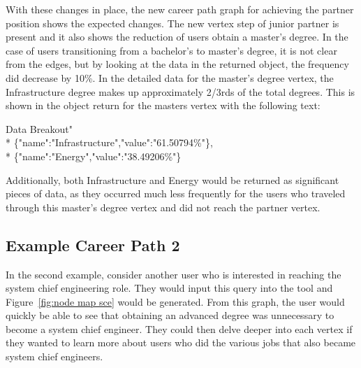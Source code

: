 With these changes in place, the new career path graph for achieving the partner
position shows the expected changes.  The new vertex step of junior partner is
present and it also shows the reduction of users obtain a master's degree.  In
the case of users transitioning from a bachelor's to master's degree, it is not
clear from the edges, but by looking at the data in the returned object, the
frequency did decrease by 10\%.  In the detailed data for the master's degree
vertex, the Infrastructure degree makes up approximately 2/3rds of the total
degrees.  This is shown in the object return for the masters vertex with the
following text:

\begin{tt}
\begin{footnotesize}
\indent Data Breakout"\\*
\indent \indent \indent \{"name":"Infrastructure","value":"61.50794\%"\},\\*
\indent \indent \indent \{"name":"Energy","value":"38.49206\%"\}
\end{footnotesize}
\end{tt}

\noindent Additionally, both Infrastructure and Energy would be returned as
significant pieces of data, as they occurred much less frequently for the users
who traveled through this master's degree vertex and did not reach the partner
vertex.

\subsection{Example Career Path 2 }
In the second example, consider another user who is interested in reaching the
system chief engineering role.  They would input this query into the tool and
Figure~\ref{fig:node map sce} would be generated.  From this graph, the user
would quickly be able to see that obtaining an advanced degree was unnecessary
to become a system chief engineer.  They could then delve deeper into each vertex
if they wanted to learn more about users who did the various jobs that also
became system chief engineers.


\usetikzlibrary{shapes,arrows,chains,decorations.markings}

